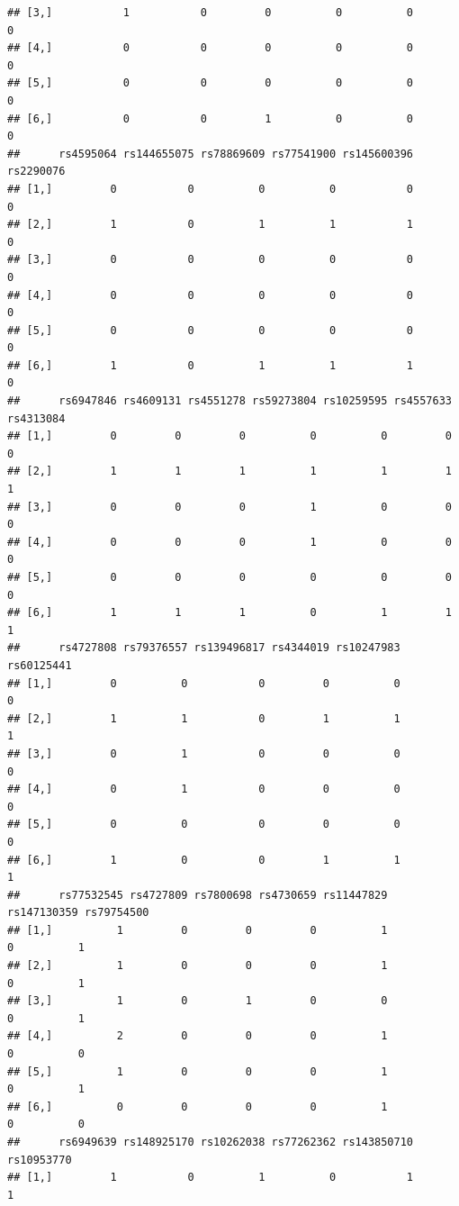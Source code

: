 \documentclass[
]{article}
\begin{document}
\begin{verbatim}
## [3,]           1           0         0          0          0           0
## [4,]           0           0         0          0          0           0
## [5,]           0           0         0          0          0           0
## [6,]           0           0         1          0          0           0
##      rs4595064 rs144655075 rs78869609 rs77541900 rs145600396 rs2290076
## [1,]         0           0          0          0           0         0
## [2,]         1           0          1          1           1         0
## [3,]         0           0          0          0           0         0
## [4,]         0           0          0          0           0         0
## [5,]         0           0          0          0           0         0
## [6,]         1           0          1          1           1         0
##      rs6947846 rs4609131 rs4551278 rs59273804 rs10259595 rs4557633 rs4313084
## [1,]         0         0         0          0          0         0         0
## [2,]         1         1         1          1          1         1         1
## [3,]         0         0         0          1          0         0         0
## [4,]         0         0         0          1          0         0         0
## [5,]         0         0         0          0          0         0         0
## [6,]         1         1         1          0          1         1         1
##      rs4727808 rs79376557 rs139496817 rs4344019 rs10247983 rs60125441
## [1,]         0          0           0         0          0          0
## [2,]         1          1           0         1          1          1
## [3,]         0          1           0         0          0          0
## [4,]         0          1           0         0          0          0
## [5,]         0          0           0         0          0          0
## [6,]         1          0           0         1          1          1
##      rs77532545 rs4727809 rs7800698 rs4730659 rs11447829 rs147130359 rs79754500
## [1,]          1         0         0         0          1           0          1
## [2,]          1         0         0         0          1           0          1
## [3,]          1         0         1         0          0           0          1
## [4,]          2         0         0         0          1           0          0
## [5,]          1         0         0         0          1           0          1
## [6,]          0         0         0         0          1           0          0
##      rs6949639 rs148925170 rs10262038 rs77262362 rs143850710 rs10953770
## [1,]         1           0          1          0           1          1

\end{verbatim}
\end{document}
